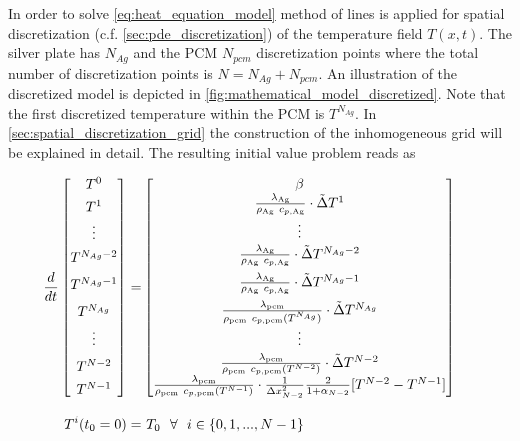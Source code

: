 \documentclass{scrartcl}[12pt, halfparskip]
\numberwithin{equation}{section}
\numberwithin{figure}{section}
\numberwithin{table}{section}
\begin{document}
In order to solve \cref{eq:heat_equation_model} method of lines is applied for spatial discretization (c.f. \cref{sec:pde_discretization}) of the temperature field $T(x,t)$. The silver plate has $N_{Ag}$ and the PCM $N_{pcm}$ discretization points where the total number of discretization points is $N = N_{Ag} + N_{pcm}$.
An illustration of the discretized model is depicted in \cref{fig:mathematical_model_discretized}. Note that the first discretized temperature within the PCM is $T^{N_{Ag}}$.
In \cref{sec:spatial_discretization_grid} the construction of the inhomogeneous grid will be explained in detail. The resulting initial value problem reads as

\begin{align}
\hspace{-2cm}
\frac{d}{dt} \begin{bmatrix*}
T^0 \\[1ex]
T^1 \\[0.3ex]
\vdots \\[1ex]
T^{N_{Ag}-2} \\[1.7ex]
T^{N_{Ag}-1} \\[1.7ex]
T^{N_{Ag}} \\[0.5ex]
\vdots \\[1.5ex]
T^{N-2} \\[1ex]
T^{N-1}
\end{bmatrix*} = &
\begin{bmatrix}
\beta \\
\frac{\lambda_{\text{Ag}}}{\rho_{\text{Ag}} \ c_{p,\text{Ag}}} \cdot \tilde{\Delta} T^1 \\[0.7ex]
\vdots \\[0.3ex]
\frac{\lambda_{\text{Ag}}}{\rho_{\text{Ag}} \ c_{p,\text{Ag}}} \cdot \tilde{\Delta} T^{N_{Ag}-2} \\[1.5ex]
\frac{\lambda_{\text{Ag}}}{\rho_{\text{Ag}} \ c_{p,\text{Ag}}} \cdot \tilde{\Delta} T^{N_{Ag}-1} \\[1.5ex]
\frac{\lambda_{\text{pcm}}}{\rho_{\text{pcm}} \ c_{p,{\text{pcm}}}(T^{N_{Ag}})} \cdot \tilde{\Delta} T^{N_{Ag}} \\[0.5ex]
\vdots \\[0.5ex]
\frac{\lambda_{\text{pcm}}}{\rho_{\text{pcm}} \ c_{p,{\text{pcm}}}(T^{N-2})} \cdot \tilde{\Delta} T^{N-2} \\[0.5ex]
\frac{\lambda_{\text{pcm}}}{\rho_{\text{pcm}} \ c_{p,\text{pcm}}(T^{N-1})} \cdot \frac{1}{\Delta x_{N-2}^2} \frac{2}{1 + \alpha_{N-2}} [T^{N-2} - T^{N-1}]
\end{bmatrix} \label{eq:heat_equation_discretized} \\[2ex]
T^i(t_0=0) = & \ T_0 \ \ \forall \ \ i \in \{ 0,1,...,N-1 \} \nonumber
\end{align}
\end{document}
